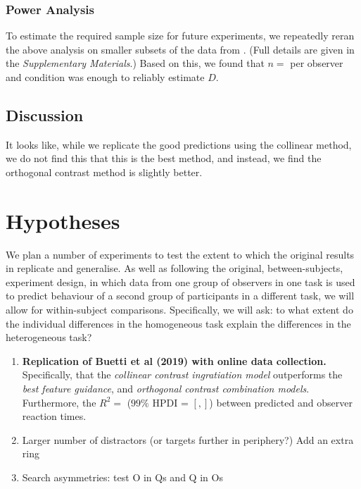 \documentclass[smallextended]{svjour3}       %
\begin{document}
\subsubsection{Power Analysis}
\label{sec:power}

To estimate the required sample size for future experiments, we repeatedly reran the above analysis on smaller subsets of the data from \cite{buetti2019predicting}. (Full details are given in the \textit{Supplementary Materials}.) Based on this, we found that $n = $ per observer and condition was enough to reliably estimate $D$. 

\subsection{Discussion}

It looks like, while we replicate the good predictions using the collinear method, we do not find this that this is the best method, and instead, we find the orthogonal contrast method is slightly better. 

\section{Hypotheses}

We plan a number of experiments to test the extent to which the original results in \cite{buetti2019predicting} replicate and generalise. As well as following the original, between-subjects, experiment design, in which data from one group of observers in one task is used to predict behaviour of a second group of participants in a different task, we will allow for within-subject comparisons. Specifically, we will ask: to what extent do the individual differences in the homogeneous task explain the differences in the heterogeneous task? 

\begin{enumerate}
\item \textbf{Replication of Buetti et al (2019) with online data collection.} Specifically, that the \textit{collinear contrast ingratiation model} outperforms the \textit{best feature guidance}, and \textit{orthogonal contrast combination models}.  Furthermore, the $R^2 = $ ($99\%$ HPDI = $[, ]$) between predicted and observer reaction times.\\
\item Larger number of distractors (or targets further in periphery?) Add an extra ring \\ 
\item Search asymmetries: test O in Qs and Q in Os \\
\end{enumerate}
\end{document}
